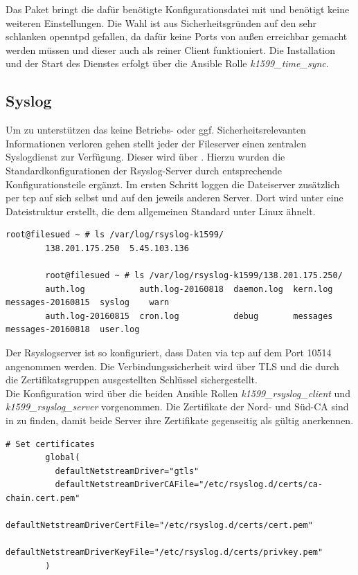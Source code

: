 Das Paket  bringt die dafür benötigte Konfigurationsdatei mit und benötigt keine weiteren Einstellungen. Die Wahl ist aus Sicherheitsgründen auf den sehr schlanken openntpd gefallen, da dafür keine Ports von außen erreichbar gemacht werden müssen und dieser auch als reiner Client funktioniert. Die Installation und der Start des Dienstes erfolgt über die Ansible Rolle \textit{k1599\_time\_sync}.

\subsection{Syslog}
Um zu unterstützen das keine Betriebs- oder ggf. Sicherheitsrelevanten Informationen verloren gehen stellt jeder der Fileserver einen zentralen Syslogdienst zur Verfügung. Dieser wird über . Hierzu wurden die Standardkonfigurationen der Rsyslog-Server durch entsprechende Konfigurationsteile ergänzt. Im ersten Schritt loggen die Dateiserver zusätzlich per tcp auf sich selbst und auf den jeweils anderen Server. Dort wird unter  eine Dateistruktur erstellt, die dem allgemeinen Standard unter Linux ähnelt.

\begin{lstlisting}[label=code:syslog,caption=Syslog Dateien]
        root@filesued ~ # ls /var/log/rsyslog-k1599/
        138.201.175.250  5.45.103.136

        root@filesued ~ # ls /var/log/rsyslog-k1599/138.201.175.250/
        auth.log           auth.log-20160818  daemon.log  kern.log  messages-20160815  syslog    warn
        auth.log-20160815  cron.log           debug       messages  messages-20160818  user.log
\end{lstlisting}

Der Rsyslogserver ist so konfiguriert, dass Daten via tcp auf dem Port 10514
angenommen werden. Die Verbindungssicherheit wird über TLS und die durch die
Zertifikatsgruppen ausgestellten Schlüssel sichergestellt.\\

Die Konfiguration wird über die beiden Ansible Rollen \textit{k1599\_rsyslog\_client} und
\textit{k1599\_rsyslog\_server} vorgenommen. Die Zertifikate der Nord- und Süd-CA sind in  zu finden, damit beide Server ihre Zertifikate gegenseitig als gültig anerkennen.

\begin{lstlisting}[label=code:syslog2,caption=Auszug aus \_rsyslog\_server/templates/etc/rsyslog.d/30\_imtcp\_remote\_input.conf.j2]
        # Set certificates
        global(
          defaultNetstreamDriver="gtls"
          defaultNetstreamDriverCAFile="/etc/rsyslog.d/certs/ca-chain.cert.pem"
          defaultNetstreamDriverCertFile="/etc/rsyslog.d/certs/cert.pem"
          defaultNetstreamDriverKeyFile="/etc/rsyslog.d/certs/privkey.pem"
        )
\end{lstlisting}

